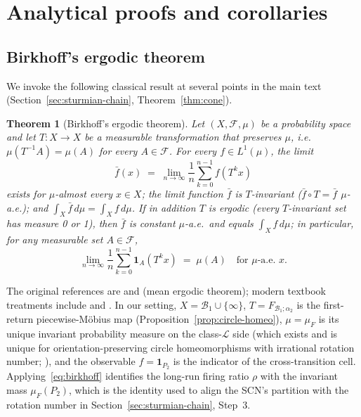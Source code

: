 \documentclass[12pt]{article}
\newcommand{\Bsp}{\mathcal{B}}
\newtheorem{theorem}{Theorem}
\begin{document}
\section{Analytical proofs and corollaries}\label{app:proofs}

\subsection{Birkhoff's ergodic theorem}\label{app:birkhoff}

We invoke the following classical result at several points in the main text (Section~\ref{sec:sturmian-chain}, Theorem~\ref{thm:cone}).

\begin{theorem}[Birkhoff's ergodic theorem]\label{thm:birkhoff}
Let $(X,\mathcal{F},\mu)$ be a probability space and let $T:X\to X$ be a measurable transformation that preserves $\mu$, i.e.\ $\mu(T^{-1}A)=\mu(A)$ for every $A\in\mathcal{F}$. For every $f\in L^1(\mu)$, the limit
\begin{equation}\label{eq:birkhoff}
\bar f(x)\;=\;\lim_{n\to\infty}\frac{1}{n}\sum_{k=0}^{n-1}f(T^kx)
\end{equation}
exists for $\mu$-almost every $x\in X$; the limit function $\bar f$ is $T$-invariant ($\bar f\circ T=\bar f$ $\mu$-a.e.); and $\int_X\bar f\,d\mu=\int_X f\,d\mu$. If in addition $T$ is \emph{ergodic} (every $T$-invariant set has measure 0 or 1), then $\bar f$ is constant $\mu$-a.e.\ and equals $\int_X f\,d\mu$; in particular, for any measurable set $A\in\mathcal{F}$,
\[
\lim_{n\to\infty}\frac{1}{n}\sum_{k=0}^{n-1}\mathbf{1}_A(T^kx)\;=\;\mu(A)\quad\text{for $\mu$-a.e.\ }x.
\]
\end{theorem}

The original references are \citet{birkhoff1931proof} and \citet{vonneumann1932proof} (mean ergodic theorem); modern textbook treatments include \citet{walters2000introduction} and \citet{petersen1983ergodic}. In our setting, $X=\Bsp_1\cup\{\infty\}$, $T=F_{\!\Bsp_1;\alpha_2}$ is the first-return piecewise-M\"obius map (Proposition~\ref{prop:circle-homeo}), $\mu=\mu_F$ is its unique invariant probability measure on the class-$\mathcal L$ side (which exists and is unique for orientation-preserving circle homeomorphisms with irrational rotation number; \citealp{herman1979conjugaison}), and the observable $f=\mathbf{1}_{P_2}$ is the indicator of the cross-transition cell. Applying~\eqref{eq:birkhoff} identifies the long-run firing ratio $\rho$ with the invariant mass $\mu_F(P_2)$, which is the identity used to align the SCN's partition with the rotation number in Section~\ref{sec:sturmian-chain}, Step~3.
\end{document}
